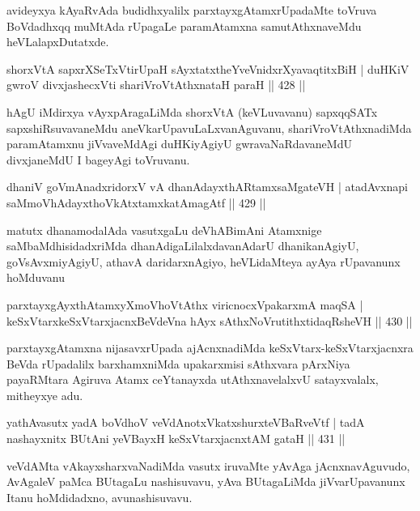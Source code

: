 \begin{artha}
avideyxya kAyaRvAda budidhxyalilx parxtayxgAtamxrUpadaMte toVruva BoVdadhxqq muMtAda rUpagaLe paramAtamxna samutAthxnaveMdu heVLalapxDutatxde.
\end{artha}

\begin{shl}
shorxVtA sapxrXSeTxVtirUpaH sAyxtatxtheYveVnidxrXyavaqtitxBiH |
duHKiV gwroV divxjashecxVti shariVroVtAthxnataH paraH \hfill  || 428 ||
\end{shl}

\begin{artha}
hAgU iMdirxya vAyxpAragaLiMda shorxVtA (keVLuvavanu) sapxqqSATx sapxshiRsuvavaneMdu aneVkarUpavuLaLxvanAguvanu, shariVroVtAthxnadiMda paramAtamxnu jiVvaveMdAgi duHKiyAgiyU gwravaNaRdavaneMdU divxjaneMdU I bageyAgi toVruvanu.
\end{artha}

\begin{shl}
dhaniV goVmAnadxridorxV vA dhanAdayxthARtamxsaMgateVH |
atadAvxnapi saMmoVhAdayxthoVkAtxtamxkatAmagAtf \hfill  || 429 ||
\end{shl}

\begin{artha}
matutx dhanamodalAda vasutxgaLu deVhABimAni Atamxnige
saMbaMdhisidadxriMda dhanAdigaLilalxdavanAdarU dhanikanAgiyU,
goVsAvxmiyAgiyU, athavA daridarxnAgiyo, heVLidaMteya ayAya rUpavanunx
hoMduvanu
\end{artha}


\begin{shl}
parxtayxgAyxthAtamxyXmoVhoVtAthx viricnocxVpakarxmA maqSA |
keSxVtarxkeSxVtarxjacnxBeVdeVna hAyx sAthxNoVrutithxtidaqRsheVH \hfill  || 430 ||
\end{shl}

\begin{artha}
parxtayxgAtamxna nijasavxrUpada ajAcnxnadiMda keSxVtarx-keSxVtarxjacnxra BeVda rUpadalilx barxhamxniMda upakarxmisi sAthxvara pArxNiya payaRMtara Agiruva Atamx ceYtanayxda utAthxnavelalxvU satayxvalalx, mitheyxye adu.
\end{artha}

\begin{shl}
yathAvasutx yadA boVdhoV veVdAnotxVkatxshurxteVBaRveVtf |
tadA nashayxnitx BUtAni yeVBayxH keSxVtarxjacnxtAM gataH \hfill  || 431 ||
\end{shl}

\begin{artha}
veVdAMta vAkayxsharxvaNadiMda vasutx iruvaMte yAvAga jAcnxnavAguvudo, AvAgaleV paMca BUtagaLu nashisuvavu, yAva BUtagaLiMda jiVvarUpavanunx Itanu hoMdidadxno, avunashisuvavu.
\end{artha}


